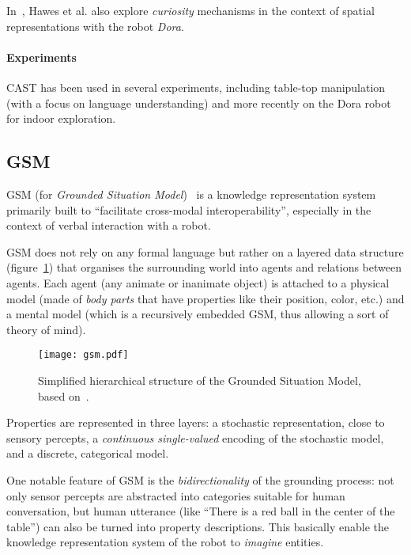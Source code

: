 \documentclass[journal]{IEEEtran}
\begin{document}
In~\cite{Hawes2011}, Hawes et al. also explore \emph{curiosity} mechanisms in
the context of spatial representations with the robot \emph{Dora}.

\paragraph{Experiments} CAST has been used in several experiments, including
table-top manipulation (with a focus on language understanding) and more
recently on the Dora robot~\cite{Hawes2011} for indoor exploration.

\subsection{GSM}
\label{sect|gsm}

GSM (for \emph{Grounded Situation Model})~\cite{Mavridis2006} is a knowledge
representation system primarily built to ``facilitate cross-modal
interoperability'',  especially in the context of verbal interaction with a
robot.

GSM does not rely on any formal language but rather on a layered data structure
(figure~\ref{fig|gsm}) that organises the surrounding world into agents and
relations between agents.  Each agent (any animate or inanimate object) is
attached to a physical model (made of \emph{body parts} that have properties
like their position, color, etc.) and a mental model (which is a recursively
embedded GSM, thus allowing a sort of theory of mind).

\begin{figure}
    \centering
    \texttt{[image: gsm.pdf]}

    \caption{Simplified hierarchical structure of the Grounded Situation Model,
    based on~\cite{Mavridis2006}.}

    \label{fig|gsm}
\end{figure}

Properties are represented in three layers: a stochastic representation, close
to sensory percepts, a \emph{continuous single-valued} encoding of the
stochastic model, and a discrete, categorical model.

One notable feature of GSM is the \emph{bidirectionality} of the grounding
process: not only sensor percepts are abstracted into categories suitable for
human conversation, but human utterance (like ``There is a red ball in the
center of the table'') can also be turned into property descriptions. This
basically enable the knowledge representation system of the robot to
\emph{imagine} entities.
\end{document}
